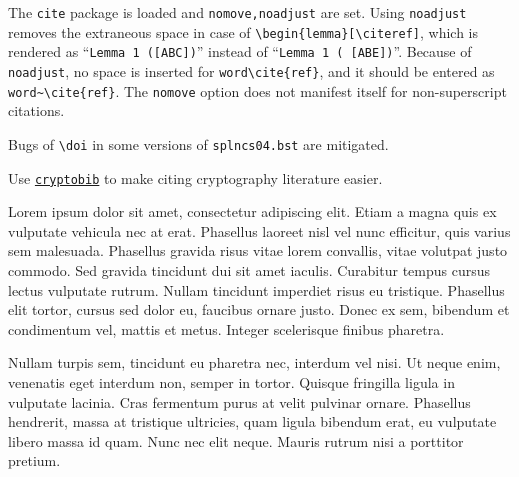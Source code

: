 The \texttt{cite} package is loaded and \texttt{nomove,noadjust} are set.
Using \texttt{noadjust} removes the extraneous space
in case of \texttt{\textbackslash begin\{lemma\}[\textbackslash cite{ref}]},
which is rendered as ``\texttt{Lemma 1 ([ABC])}''
instead of ``\texttt{Lemma 1 ( [ABE])}''.
Because of \texttt{noadjust},
no space is inserted for \texttt{word\textbackslash cite\{ref\}},
and it should be entered as
\texttt{word\textasciitilde\textbackslash cite\{ref\}}.
The \texttt{nomove} option does not manifest itself
for non-superscript citations.

Bugs of \texttt{\textbackslash doi}
in some versions of \texttt{splncs04.bst}
are mitigated.

Use \href{https://github.com/cryptobib/export}{\texttt{cryptobib}} to make citing cryptography literature easier.

Lorem ipsum dolor sit amet, consectetur adipiscing elit. Etiam a magna quis ex vulputate vehicula nec at erat. Phasellus laoreet nisl vel nunc efficitur, quis varius sem malesuada. Phasellus gravida risus vitae lorem convallis, vitae volutpat justo commodo. Sed gravida tincidunt dui sit amet iaculis. Curabitur tempus cursus lectus vulputate rutrum. Nullam tincidunt imperdiet risus eu tristique. Phasellus elit tortor, cursus sed dolor eu, faucibus ornare justo. Donec ex sem, bibendum et condimentum vel, mattis et metus. Integer scelerisque finibus pharetra.

Nullam turpis sem, tincidunt eu pharetra nec, interdum vel nisi. Ut neque enim, venenatis eget interdum non, semper in tortor. Quisque fringilla ligula in vulputate lacinia. Cras fermentum purus at velit pulvinar ornare. Phasellus hendrerit, massa at tristique ultricies, quam ligula bibendum erat, eu vulputate libero massa id quam. Nunc nec elit neque. Mauris rutrum nisi a porttitor pretium.
